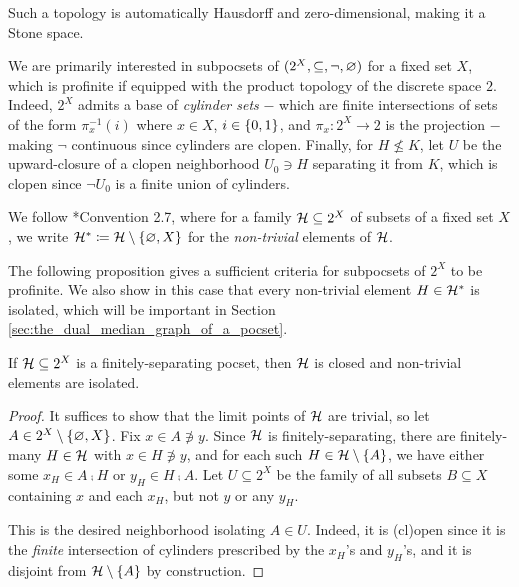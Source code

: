 \documentclass[reqno]{amsart}
\begin{document}
    \begin{remark}
        Such a topology is automatically Hausdorff and zero-dimensional, making it a Stone space.
    \end{remark}

    We are primarily interested in subpocsets of $(2^X,\subseteq,\lnot,\em)$ for a fixed set $X$, which is profinite if equipped with the product topology of the discrete space $2$. Indeed, $2^X$ admits a base of \textit{cylinder sets} $-$ which are finite intersections of sets of the form $\pi^{-1}_x(i)$ where $x\in X$, $i\in\l\{0,1\r\}$, and $\pi_x:2^X\to2$ is the projection $-$ making $\lnot$ continuous since cylinders are clopen. Finally, for $H\not\leq K$,  let $U$ be the upward-closure of a clopen neighborhood $U_0\ni H$ separating it from $K$, which is clopen since $\lnot U_0$ is a finite union of cylinders.

    \begin{remark*}
        We follow \cite{CPTT23}*{Convention 2.7}, where for a family $\mc{H}\subseteq2^X$ of subsets of a fixed set $X$, we write $\mc{H}^\ast\coloneqq\mc{H}\comp\l\{\em,X\r\}$ for the \textit{non-trivial} elements of $\mc{H}$.
    \end{remark*}

    The following proposition gives a sufficient criteria for subpocsets of $2^X$ to be profinite. We also show in this case that every non-trivial element $H\in\mc{H}^\ast$ is isolated, which will be important in Section \ref{sec:the_dual_median_graph_of_a_pocset}.

    \begin{lemma}\label{lem:finitely-separating_non-trivial_isolated}
        If $\mc{H}\subseteq2^X$ is a finitely-separating pocset, then $\mc{H}$ is closed and non-trivial elements are isolated.
    \end{lemma}
    \begin{proof}
        It suffices to show that the limit points of $\mc{H}$ are trivial, so let $A\in2^X\comp\l\{\em,X\r\}$. Fix $x\in A\not\ni y$. Since $\mc{H}$ is finitely-separating, there are finitely-many $H\in\mc{H}$ with $x\in H\not\ni y$, and for each such $H\in\mc{H}\comp\l\{A\r\}$, we have either some $x_H\in A\comp H$ or $y_H\in H\comp A$. Let $U\subseteq2^X$ be the family of all subsets $B\subseteq X$ containing $x$ and each $x_H$, but not $y$ or any $y_H$.

        This is the desired neighborhood isolating $A\in U$. Indeed, it is (cl)open since it is the \textit{finite} intersection of cylinders prescribed by the $x_H$'s and $y_H$'s, and it is disjoint from $\mc{H}\comp\l\{A\r\}$ by construction.
    \end{proof}
\end{document}
